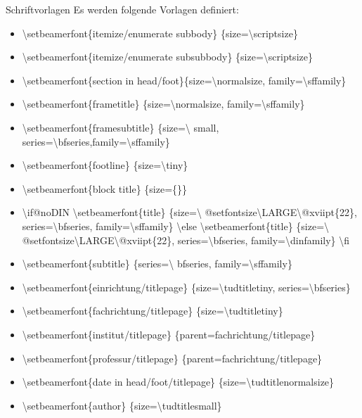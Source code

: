 \documentclass[presentation,t]{beamer}
\begin{document}
\begin{frame}[label=sec-2-4-3]{Schriftvorlagen}
Es werden folgende Vorlagen definiert:
\begin{itemize}
\item \textbackslash setbeamerfont\{itemize/enumerate subbody\} \{size=\textbackslash scriptsize\}
\item \textbackslash setbeamerfont\{itemize/enumerate subsubbody\} \{size=\textbackslash scriptsize\}
\item \textbackslash setbeamerfont\{section in head/foot\}\{size=\textbackslash normalsize, family=\textbackslash sffamily\}
\item \textbackslash setbeamerfont\{frametitle\} \{size=\textbackslash normalsize, family=\textbackslash sffamily\}
\item \textbackslash setbeamerfont\{framesubtitle\} \{size=\textbackslash
   small, series=\textbackslash bfseries,family=\textbackslash sffamily\}
\item \textbackslash setbeamerfont\{footline\} \{size=\textbackslash tiny\}
\item \textbackslash setbeamerfont\{block title\} \{size=\{\}\}
\item \textbackslash if@noDIN
  \textbackslash setbeamerfont\{title\} \{size=\textbackslash
 @setfontsize\textbackslash LARGE\textbackslash @xviipt\{22\},
 series=\textbackslash bfseries, family=\textbackslash sffamily\}
\textbackslash else
  \textbackslash setbeamerfont\{title\} \{size=\textbackslash
 @setfontsize\textbackslash LARGE\textbackslash @xviipt\{22\},
 series=\textbackslash bfseries, family=\textbackslash dinfamily\}
\textbackslash fi
\item \textbackslash setbeamerfont\{subtitle\} \{series=\textbackslash
   bfseries, family=\textbackslash sffamily\}
\item \textbackslash setbeamerfont\{einrichtung/titlepage\}
\{size=\textbackslash tudtitletiny, series=\textbackslash bfseries\}
\item \textbackslash setbeamerfont\{fachrichtung/titlepage\} \{size=\textbackslash tudtitletiny\}
\item \textbackslash setbeamerfont\{institut/titlepage\} \{parent=fachrichtung/titlepage\}
\item \textbackslash setbeamerfont\{professur/titlepage\} \{parent=fachrichtung/titlepage\}
\item \textbackslash setbeamerfont\{date in head/foot/titlepage\} \{size=\textbackslash tudtitlenormalsize\}
\item \textbackslash setbeamerfont\{author\} \{size=\textbackslash tudtitlesmall\}
\end{itemize}
\end{frame}
\end{document}
